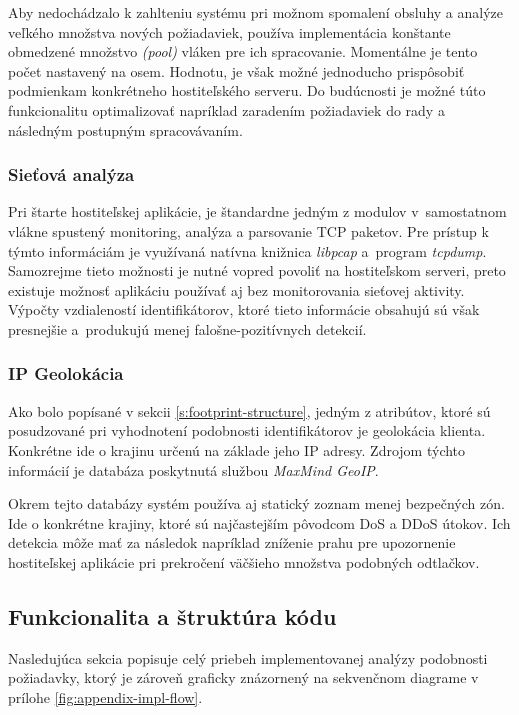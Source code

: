 \documentclass[
  digital, %
  oneside, %
  table,   %
  lof,     %
  nolot,   %
  nocover
]{fithesis3}
\begin{document}
Aby nedochádzalo k zahlteniu systému pri možnom spomalení obsluhy a analýze veľkého množstva 
nových požiadaviek, používa implementácia konštante obmedzené množstvo \textit{(pool)}
vláken pre ich spracovanie. Momentálne je tento počet nastavený na osem. Hodnotu, je však
možné jednoducho prispôsobiť podmienkam konkrétneho hostiteľského serveru. Do budúcnosti
je možné túto funkcionalitu optimalizovať napríklad zaradením požiadaviek do rady a následným
postupným spracovávaním. 

\subsubsection{\bf{Sieťová analýza}}
Pri štarte hostiteľskej aplikácie, je štandardne jedným z modulov v~samostatnom
vlákne spustený monitoring, analýza a parsovanie TCP paketov. Pre prístup k
týmto informáciám je využívaná natívna knižnica \textit{libpcap} a~program
\textit{tcpdump}. Samozrejme tieto možnosti je nutné vopred povoliť na
hostiteľskom serveri, preto existuje možnosť aplikáciu používať aj bez
monitorovania sieťovej aktivity. Výpočty vzdialeností identifikátorov, ktoré
tieto informácie obsahujú sú však presnejšie a~produkujú menej falošne-pozitívnych detekcií.

\subsubsection{\bf{IP Geolokácia}}
Ako bolo popísané v sekcii \ref{s:footprint-structure}, jedným z atribútov, ktoré sú posudzované pri
vyhodnotení podobnosti identifikátorov je geolokácia klienta. Konkrétne ide o
krajinu určenú na základe jeho IP adresy. Zdrojom týchto
informácií je databáza poskytnutá službou \textit{MaxMind GeoIP}.

Okrem tejto databázy systém používa aj statický zoznam menej bezpečných zón.
Ide o konkrétne krajiny, ktoré sú najčastejším pôvodcom DoS a DDoS útokov. Ich
detekcia môže mať za následok napríklad zníženie prahu pre upozornenie
hostiteľskej aplikácie pri prekročení väčšieho množstva podobných odtlačkov.

\subsection{Funkcionalita a štruktúra kódu}
Nasledujúca sekcia popisuje celý priebeh implementovanej analýzy podobnosti
požiadavky, ktorý je zároveň graficky znázornený na sekvenčnom diagrame v prílohe \ref{fig:appendix-impl-flow}.
\end{document}

